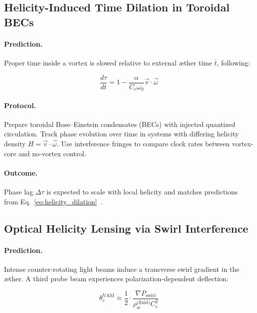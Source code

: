 \documentclass[preprint]{revtex4-2}
\begin{document}
            \subsection{Helicity-Induced Time Dilation in Toroidal BECs}
            \paragraph{Prediction.}
            Proper time inside a vortex is slowed relative to external æther time \( \bar{t} \), following:
        
            \begin{equation}
            \frac{d\tau}{dt} = 1 - \frac{\alpha}{C_e \omega_0} \vec{v} \cdot \vec{\omega}
            \label{eq:helicity_dilation}
            \end{equation}
        
            \paragraph{Protocol.}
            Prepare toroidal Bose–Einstein condensates (BECs) with injected quantized circulation. Track phase evolution over time in systems with differing helicity density \( H = \vec{v} \cdot \vec{\omega} \). Use interference fringes to compare clock rates between vortex-core and no-vortex control.
        
            \paragraph{Outcome.}
            Phase lag \( \Delta \tau \) is expected to scale with local helicity and matches predictions from Eq.~\ref{eq:helicity_dilation}~\cite{volovik2003universe, ranada1990topological}.
        
            \subsection{Optical Helicity Lensing via Swirl Interference}
            \paragraph{Prediction.}
            Intense counter-rotating light beams induce a transverse swirl gradient in the æther. A third probe beam experiences polarization-dependent deflection:
        
            \begin{equation}
                \boxed{
                    \theta_r^{\text{VAM}} \approx \frac{1}{2} \cdot \frac{\nabla P_{\text{swirl}}}{\rho_{\text{\ae}}^{\text{(fluid)}} C_e^2}
                }
            \label{eq:optical_deflection}
            \end{equation}
        
\end{document}
